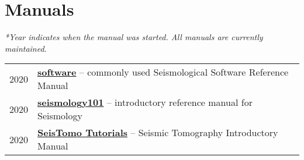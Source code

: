 \section*{Manuals}

\textit{*Year indicates when the manual was started. All manuals are currently maintained.}

\begin{tabular}{p{} p{}}
2020 &	\textbf{\href{https://seismo-learn.org/software/}{software}} -- commonly used Seismological Software Reference Manual \\
2020 &	\textbf{\href{https://seismo-learn.org/seismology101/}{seismology101}} -- introductory reference manual for Seismology \\
2020 &  \textbf{\href{https://migg-ntu.github.io/SeisTomo_Tutorials/}{SeisTomo Tutorials}} -- Seismic Tomography Introductory Manual \\
\end{tabular}
